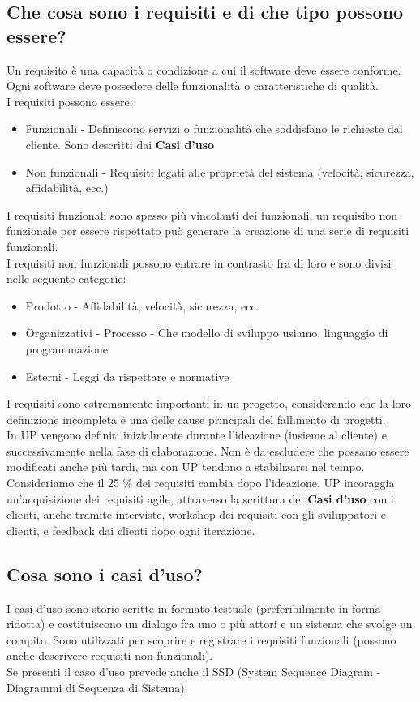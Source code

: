 \documentclass[12pt, a4paper, openany]{book}
\begin{document}
\subsection*{Che cosa sono i requisiti e di che tipo possono essere?}
Un requisito è una capacità o condizione a cui il software deve essere conforme. Ogni software
deve possedere delle funzionalità o caratteristiche di qualità.\\
I requisiti possono essere:
\begin{itemize}
    \item Funzionali - Definiscono servizi o funzionalità che soddisfano le richieste dal cliente. Sono
    descritti dai \textbf{Casi d'uso}
    \item Non funzionali - Requisiti legati alle proprietà  del sistema (velocità, sicurezza, affidabilità, ecc.)
\end{itemize}
I requisiti funzionali sono spesso più vincolanti dei funzionali, un requisito non funzionale per
essere rispettato può generare la creazione di una serie di requisiti funzionali.\\
I requisiti non funzionali possono entrare in contrasto fra di loro e sono divisi nelle seguente categorie:
\begin{itemize}
    \item Prodotto - Affidabilità, velocità, sicurezza, ecc.
    \item Organizzativi - Processo - Che modello di sviluppo usiamo, linguaggio di programmazione
    \item Esterni - Leggi da rispettare e normative
\end{itemize}
I requisiti sono estremamente importanti in un progetto, considerando che la loro
definizione incompleta è una delle cause principali del fallimento di progetti.\\
In UP vengono definiti inizialmente durante l'ideazione (insieme al cliente) e successivamente
nella fase di elaborazione. Non è da escludere che possano essere modificati anche più tardi,
ma con UP tendono a stabilizarsi nel tempo. Consideriamo che il 25 \% dei requisiti cambia dopo
l'ideazione. UP incoraggia un'acquisizione dei requisiti agile, attraverso la scrittura 
dei \textbf{Casi d'uso} con i clienti, anche tramite interviste, workshop dei requisiti con gli sviluppatori
e clienti, e feedback dai clienti dopo ogni iterazione.

\subsection*{Cosa sono i casi d'uso?}
I casi d'uso sono storie scritte in formato testuale (preferibilmente in forma ridotta)
e costituiscono un dialogo fra uno o più attori e un sistema che svolge un compito. Sono
utilizzati per scoprire e registrare i requisiti funzionali (possono anche descrivere requisiti
non funzionali).\\
Se presenti il caso d'uso prevede anche il SSD (System Sequence Diagram - Diagrammi di Sequenza di Sistema).
\end{document}
